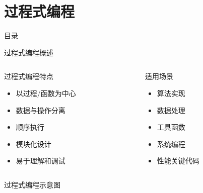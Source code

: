 \documentclass[UTF8,aspectratio=169]{beamer}
\begin{document}
\section{过程式编程}
\begin{frame}{目录}
    \begin{multicols}{2}
        \tableofcontents[currentsection]
    \end{multicols}
\end{frame}

\begin{frame}{过程式编程概述}
    \begin{columns}
        \begin{column}{0.48\textwidth}
            \begin{ytublock}{过程式编程特点}
                \begin{itemize}
                    \item 以过程/函数为中心
                    \item 数据与操作分离
                    \item 顺序执行
                    \item 模块化设计
                    \item 易于理解和调试
                \end{itemize}
            \end{ytublock}
        \end{column}
        \begin{column}{0.48\textwidth}
            \begin{ytublock}{适用场景}
                \begin{itemize}
                    \item 算法实现
                    \item 数据处理
                    \item 工具函数
                    \item 系统编程
                    \item 性能关键代码
                \end{itemize}
            \end{ytublock}
        \end{column}
    \end{columns}
    \begin{ytublock}{过程式编程示意图}
        \begin{center}
        \begin{tikzpicture}[node distance=2.2cm, every node/.style={font=\small}]

\end{tikzpicture}
\end{center}
\end{ytublock}
\end{frame}
\end{document}
